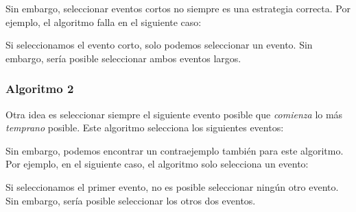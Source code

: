 Sin embargo, seleccionar eventos cortos no siempre
es una estrategia correcta. Por ejemplo, el algoritmo falla
en el siguiente caso:
\begin{center}
\end{center}
Si seleccionamos el evento corto, solo podemos seleccionar un evento.
Sin embargo, sería posible seleccionar ambos eventos largos.

\subsubsection*{Algoritmo 2}

Otra idea es seleccionar siempre el siguiente evento posible
que \emph{comienza} lo más \emph{temprano} posible.
Este algoritmo selecciona los siguientes eventos:
\begin{center}
\end{center}

Sin embargo, podemos encontrar un contraejemplo
también para este algoritmo.
Por ejemplo, en el siguiente caso,
el algoritmo solo selecciona un evento:
\begin{center}
\end{center}
Si seleccionamos el primer evento, no es posible
seleccionar ningún otro evento.
Sin embargo, sería posible seleccionar los
otros dos eventos.

